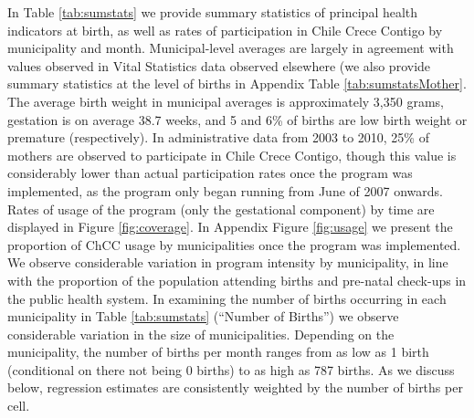 \documentclass[12pt]{article}
\begin{document}
\begin{spacing}{1.4}
In Table \ref{tab:sumstats} we provide summary statistics of
principal health indicators at birth, as well as rates of participation
in Chile Crece Contigo by municipality and month.  Municipal-level
averages are largely in agreement with values observed in Vital
Statistics data observed elsewhere (we also provide summary statistics
at the level of births in Appendix Table \ref{tab:sumstatsMother}.  The
average birth weight in municipal averages is approximately 3,350 grams,
gestation is on average 38.7 weeks, and 5 and 6\% of births are low birth
weight or premature (respectively).  In administrative data from 2003 to
2010, 25\% of mothers are observed to participate in Chile Crece Contigo,
though this value is considerably lower than actual participation rates
once the program was implemented, as the program only began running from
June of 2007 onwards.  Rates of usage of the program (only the gestational
component) by time are displayed in Figure \ref{fig:coverage}. In Appendix
Figure \ref{fig:usage} we present the proportion of ChCC usage by
municipalities once the program was implemented.  We observe considerable
variation in program intensity by municipality, in line with the proportion
of the population attending births and pre-natal check-ups in the public
health system.  In examining the number of births occurring in each
municipality in Table \ref{tab:sumstats} (``Number of Births'') we
observe considerable variation in the size of municipalities. Depending on
the municipality, the number of births per month ranges from as low as 1
birth (conditional on there not being 0 births) to as high as 787 births.
As we discuss below, regression estimates are consistently weighted by the
number of births per cell.


\end{spacing}
\end{document}

